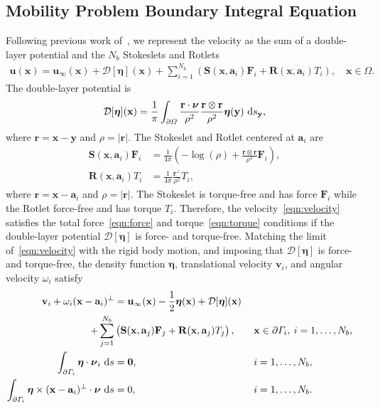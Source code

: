 \documentclass[lineno]{jfm}
\renewcommand{\aa}{\mathbf{a}}
\newcommand{\bd}{\partial}
\newcommand{\DD}{\mathcal{D}}
\newcommand{\eeta}{\boldsymbol{\eta}}
\newcommand{\FF}{\mathbf{F}}
\newcommand{\nnu}{\boldsymbol{\nu}}
\newcommand{\rr}{\mathbf{r}}
\newcommand{\RR}{\mathbf{R}}
\renewcommand{\SS}{\mathbf{S}}
\newcommand{\xx}{\mathbf{x}}
\newcommand{\uu}{\mathbf{u}}
\renewcommand{\vv}{\mathbf{v}}
\newcommand{\yy}{\mathbf{y}}
\begin{document}
\subsection{Mobility Problem Boundary Integral Equation}
Following previous work of~\cite{Lukas19}, we represent the velocity as
the sum of a double-layer potential and the $N_b$ Stokeslets and Rotlets
\begin{align}
  \label{eqn:velocity}
  \uu(\xx) = \uu_\infty(\xx) + \DD[\eeta](\xx) + 
    \sum_{i=1}^{N_b} \left(\SS(\xx,\aa_i) \FF_i + 
    \RR(\xx,\aa_i) T_i\right), \quad \xx \in \Omega.
\end{align}
The double-layer potential is
\begin{align}
  \DD[\eeta](\xx) = \frac{1}{\pi} \int_{\bd\Omega} 
    \frac{\rr \cdot \nnu}{\rho^2} \frac{\rr \otimes \rr}{\rho^2}
    \eeta(\yy) \, \dif s_\yy,
\end{align}
where $\rr = \xx - \yy$ and $\rho = |\rr|$. The Stokeslet and Rotlet
centered at $\aa_i$ are
\begin{align}
  \SS(\xx,\aa_i)\FF_i &= \frac{1}{4\pi} \left(-\log(\rho) + 
    \frac{\rr \otimes \rr}{\rho^2} \FF_i \right), \\
  \RR(\xx,\aa_i)T_i &= \frac{1}{4\pi} \frac{\rr^\perp}{\rho^2} T_i,
\end{align}
where $\rr = \xx - \aa_i$ and $\rho = |\rr|$. The Stokeslet is
torque-free and has force $\FF_i$ while the Rotlet force-free and has
torque $T_i$. Therefore, the velocity~\eqref{eqn:velocity} satisfies the
total force~\eqref{eqn:force} and torque~\eqref{eqn:torque} conditions
if the double-layer potential $\DD[\eeta]$ is force- and torque-free.
Matching the limit of~\eqref{eqn:velocity} with the rigid body motion,
and imposing that $\DD[\eeta]$ is force- and torque-free, the density
function $\eeta$, translational velocity $\vv_i$, and angular velocity
$\omega_i$ satisfy
\begin{alignat}{3}
  \nonumber
  \vv_i + \omega_i (\xx - \aa_i)^\perp &= \uu_\infty(\xx)
    -\frac{1}{2} \eeta(\xx) + \DD[\eeta](\xx) \\
  \label{eqn:SKIE}
    + \sum_{j=1}^{N_b} &
    \left(\SS(\xx,\aa_j) \FF_j + \RR(\xx,\aa_j) T_j\right),
    \quad &&\xx \in \bd \Gamma_i,\: i=1,\ldots,N_b, \\
  \label{eqn:mobility1}
  \int_{\bd\Gamma_i} \eeta \cdot \nnu_i \, \dif s &= {\bf 0}, 
  &&i = 1,\ldots,N_b, \\
  \label{eqn:mobility2}
  \int_{\bd\Gamma_i} \eeta\times(\xx-\aa_i)^\perp \cdot \nnu \, \dif s &= 0,
  &&i = 1,\ldots,N_b.
\end{alignat}
\end{document}

